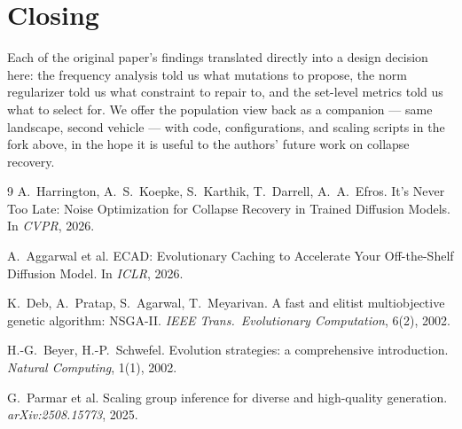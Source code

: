 \documentclass[10pt,twocolumn,letterpaper]{article}
\begin{document}
\section{Closing}

Each of the original paper's findings translated directly into a design
decision here: the frequency analysis told us what mutations to propose, the
norm regularizer told us what constraint to repair to, and the set-level
metrics told us what to select for. We offer the population view back as a
companion --- same landscape, second vehicle --- with code, configurations,
and scaling scripts in the fork above, in the hope it is useful to the
authors' future work on collapse recovery.

{\small
\begin{thebibliography}{9}
A.~Harrington, A.~S.~Koepke, S.~Karthik, T.~Darrell, A.~A.~Efros.
\newblock It's Never Too Late: Noise Optimization for Collapse Recovery in
Trained Diffusion Models.
\newblock In \emph{CVPR}, 2026.

A.~Aggarwal et al.
\newblock ECAD: Evolutionary Caching to Accelerate Your Off-the-Shelf Diffusion
Model.
\newblock In \emph{ICLR}, 2026.

K.~Deb, A.~Pratap, S.~Agarwal, T.~Meyarivan.
\newblock A fast and elitist multiobjective genetic algorithm: NSGA-II.
\newblock \emph{IEEE Trans.\ Evolutionary Computation}, 6(2), 2002.

H.-G.~Beyer, H.-P.~Schwefel.
\newblock Evolution strategies: a comprehensive introduction.
\newblock \emph{Natural Computing}, 1(1), 2002.

G.~Parmar et al.
\newblock Scaling group inference for diverse and high-quality generation.
\newblock \emph{arXiv:2508.15773}, 2025.
\end{thebibliography}
}
\end{document}

